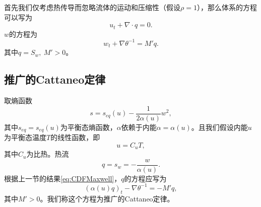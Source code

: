 首先我们仅考虑热传导而忽略流体的运动和压缩性（假设$\rho = 1$），那么体系的方程可以写为
\begin{equation*}
	 u_t  + \nabla \cdot q = 0 .	
\end{equation*}
$w$的方程为
\begin{equation*}
	 w_t + \nabla \theta^{-1} = M' q. 
\end{equation*}
其中$q = S_w,\ M'>0$。

\subsection{推广的Cattaneo定律}

取熵函数
$$s = s_{eq}(u)  -\frac{1}{2 \alpha(u)} w^2,$$
其中$s_{eq} = s_{eq}(u)$为平衡态熵函数，$\alpha$依赖于内能$\alpha=\alpha(u)$。且我们假设内能$u$为平衡态温度$T$的线性函数，即
$$u=C_u T,$$
其中$C_u$为比热。热流
$$q=s_w = -\frac{w}{\alpha(u)}.$$
根据上一节的结果\eqref{eq:CDFMaxwell}，$q$的方程应写为
\begin{equation*}
({\alpha(u)}{q})_t-\nabla \theta^{-1}= -M'{q},
\end{equation*}
其中$M'>0$。我们称这个方程为推广的Cattaneo定律。

